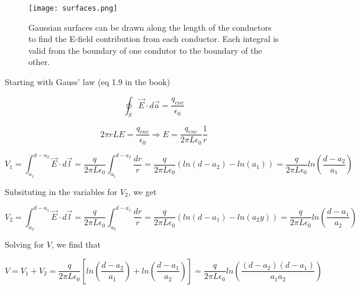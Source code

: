 \begin{figure}[h]
  \begin{center}

    \texttt{[image: surfaces.png]}

    \caption{Gaussian surfaces can be drawn along the length of the
      conductors to find the E-field contribution from each conductor.
      Each integral is valid from the boundary of one condutor to the
      boundary of the other.}

    \label{fig::1::7::gauss}

  \end{center}
\end{figure}


Starting with Gauss' law (eq 1.9 in the book)

\begin{equation}
  \oint_S \vec{E} \cdot d\vec{a} = \frac{q_{enc}}{\epsilon_0}
\end{equation}

\begin{equation}
  \label{eq::1::7::e}
  2 \pi r L E = \frac{q_{enc}}{\epsilon_0}
  \Rightarrow E = \frac{q_{enc}}{2 \pi L \epsilon_0} \frac 1 r
\end{equation}

\begin{equation}
  \label{eq::1::7::v1}
  V_1 = \int_{a_1}^{d-a_2}{\vec{E} \cdot d\vec{l}}
  = \frac{q}{2 \pi L \epsilon_0} \int_{a_1}^{d-a_2}{\frac{dr}{r}}
  = \frac{q}{2 \pi L \epsilon_0} \left( ln(d-a_2) - ln(a_1)\right)
  = \frac{q}{2 \pi L \epsilon_0} ln\left( \frac{d-a_2}{a_1} \right)
\end{equation}

Subsituting in the variables for $V_2$, we get

\begin{equation}
  \label{eq::1::7::v2}
  V_2 = \int_{a_2}^{d-a_1}{\vec{E} \cdot d\vec{l}}
  = \frac{q}{2 \pi L \epsilon_0} \int_{a_2}^{d-a_1}{\frac{dr}{r}}
  = \frac{q}{2 \pi L \epsilon_0} \left( ln(d-a_1) - ln(a_2y)\right)
  = \frac{q}{2 \pi L \epsilon_0} ln\left( \frac{d-a_1}{a_2} \right)
\end{equation}

Solving for $V$, we find that

\begin{equation}
  V = V_1 + V_2
  = \frac{q}{2 \pi L \epsilon_0} \left[ ln\left( \frac{d-a_2}{a_1} \right) + ln\left( \frac{d-a_1}{a_2} \right) \right]
  = \frac{q}{2 \pi L \epsilon_0} ln\left( \frac{(d-a_2)(d-a_1)}{a_1a_2} \right)
\end{equation}

